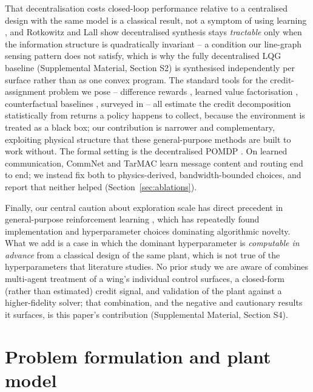 \documentclass[preprint,11pt]{elsarticle}
\begin{document}
That decentralisation costs closed-loop performance relative to a
centralised design with the same model is a classical result, not a
symptom of using learning \cite{siljak1991decentralized,
bakule2008decentralized}, and Rotkowitz and Lall
\cite{rotkowitz2006characterization} show decentralised synthesis stays
\emph{tractable} only when the information structure is quadratically
invariant -- a condition our line-graph sensing pattern does not satisfy,
which is why the fully decentralised LQG baseline (Supplemental Material,
Section S2) is synthesised independently per surface rather than as one
convex program. The standard tools for the credit-assignment problem we
pose -- difference rewards \cite{wolpert2002difference}, learned value
factorisation \cite{sunehag2018vdn,rashid2018qmix}, counterfactual baselines
\cite{foerster2018coma}, surveyed in
\cite{albrecht2023survey,scalingmarl2025,multilevelcredit2025} -- all
estimate the credit decomposition statistically from returns a policy
happens to collect, because the environment is treated as a black box; our
contribution is narrower and complementary, exploiting physical structure
that these general-purpose methods are built to work without. The formal
setting is the decentralised POMDP
\cite{bernstein2002complexity,oliehoek2016concise}. On learned
communication, CommNet \cite{sukhbaatar2016commnet} and TarMAC
\cite{das2019tarmac} learn message content and routing end to end; we
instead fix both to physics-derived, bandwidth-bounded choices, and report
that neither helped (Section~\ref{sec:ablations}).

Finally, our central caution about exploration scale has direct precedent
in general-purpose reinforcement learning
\cite{henderson2018matters,engstrom2020implementation,andrychowicz2021what,
agarwal2021precipice,yu2022mappo}, which has repeatedly found
implementation and hyperparameter choices dominating algorithmic novelty.
What we add is a case in which the dominant hyperparameter is
\emph{computable in advance} from a classical design of the same plant,
which is not true of the hyperparameters that literature studies. No prior
study we are aware of combines multi-agent treatment of a wing's individual
control surfaces, a closed-form (rather than estimated) credit signal, and
validation of the plant against a higher-fidelity solver; that combination,
and the negative and cautionary results it surfaces, is this paper's
contribution (Supplemental Material, Section S4).

\section{Problem formulation and plant model}
\label{sec:problem}
\end{document}
